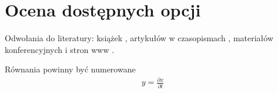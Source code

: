 \documentclass[a4paper,twoside,12pt]{book}
\newcommand{\obcy}[1]{\emph{#1}}
\newcommand{\english}[1]{{\selectlanguage{british}\obcy{#1}}}
\begin{document}
%


\chapter{Ocena dostępnych opcji}

Odwołania do literatury: 
książek \cite{bib:ksiazka},
artykułów w czasopismach \cite{bib:artykul}, 
materiałów konferencyjnych \cite{bib:konferencja}
i stron www \cite{bib:internet}.

Równania powinny być numerowane
\begin{align}
y = \frac{\partial x}{\partial t}
\end{align}
%
\end{document}
